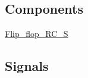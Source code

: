 \subsection*{Components}
 \begin{DoxyCompactItemize}
\item 
\hyperlink{classtb___flip__flop___r_c___s_1_1_behavioral_a027f6e762235fee0bc16d610da043d14}{Flip\+\_\+flop\+\_\+\+R\+C\+\_\+S}  {\bfseries }  \hypertarget{classtb___flip__flop___r_c___s_1_1_behavioral_a027f6e762235fee0bc16d610da043d14}{}\label{classtb___flip__flop___r_c___s_1_1_behavioral_a027f6e762235fee0bc16d610da043d14}

\end{DoxyCompactItemize}
\subsection*{Signals}

